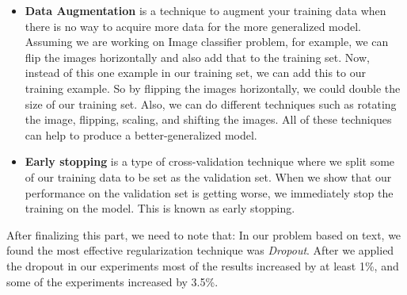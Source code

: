 \begin{itemize}
Figure~\ref{Fig:NN_Dropout} shows the idea of dropout; it randomly selects some nodes and removes them along with all of their incoming and outgoing connections. Dropout technique’s randomness makes the models’ results seem a more generalized model. For each node, we have a probability of some dropout percentage that this node will be removed with its connections. Therefore, we have some simpler network architecture. Also, dropout forces the algorithm not to rely on any feature. Hence, one must spread the weights and make the network try to learn a different type of features. Therefore, dropout is usually preferred when we have a large neural network structure in order to introduce more randomness.%
%
\begin{figure}[!ht]
	\centering
	
	\caption{A diagram demonstrating the effects of applying dropout with p = 0.5 to a deep neural networks~\cite{Gitrepo_NN_Tikz}}~\label{Fig:NN_Dropout}
\end{figure}%
\item \textbf{Data Augmentation} is a technique to augment your training data when there is no way to acquire more data for the more generalized model. Assuming we are working on Image classifier problem, for example, we can flip the images horizontally and also add that to the training set. Now, instead of this one example in our training set, we can add this to our training example. So by flipping the images horizontally, we could double the size of our training set. Also, we can do different techniques such as rotating the image, flipping, scaling, and shifting the images. All of these techniques can help to produce a better-generalized model.%

\item \textbf{Early stopping} is a type of cross-validation technique where we split some of our training data to be set as the validation set. When we show that our performance on the validation set is getting worse, we immediately stop the training on the model. This is known as early stopping.%

\end{itemize}

After finalizing this part, we need to note that: In our problem based on text, we found the most effective regularization technique was \textit{Dropout}. After we applied the dropout in our experiments most of the results increased by at least 1\%, and some of the experiments increased by 3.5\%.

